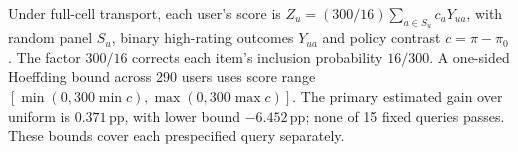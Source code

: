 Under full-cell transport, each user's score is $Z_u=(300/16)\sum_{a\in S_u}c_aY_{ua}$, with random panel $S_u$, binary high-rating outcomes $Y_{ua}$ and policy contrast $c=\pi-\pi_0$. The factor $300/16$ corrects each item's inclusion probability $16/300$. A one-sided Hoeffding bound across 290 users uses score range $[\min(0,300\min c),\max(0,300\max c)]$. The primary estimated gain over uniform is $0.371$\,pp, with lower bound $-6.452$\,pp; none of 15 fixed queries passes. These bounds cover each prespecified query separately.
